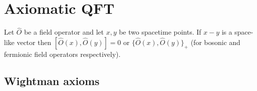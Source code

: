 \chapter{Axiomatic QFT}

	\begin{theorem}\label{qft:microcausality}
		Let $\hat{O}$ be a field operator and let $x, y$ be two spacetime points. If $x-y$ is a space-like vector then $[\hat{O}(x), \hat{O}(y)] = 0$ or $\{\hat{O}(x), \hat{O}(y)\}_+$ (for bosonic and fermionic field operators respectively).
	\end{theorem}
	 
\section{Wightman axioms}
